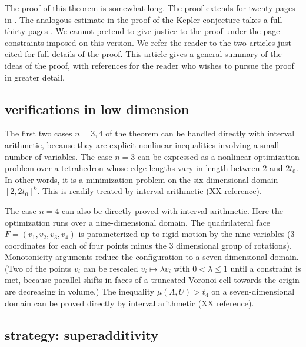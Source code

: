 The proof of this theorem is somewhat long.  The proof extends for 
twenty pages in  \cite[pp.19-38]{arx}.  The analogous estimate in
the proof of the Kepler conjecture takes a full thirty pages 
\cite[pp.126-156]{DCG}.
We cannot pretend to give justice to the proof under the page constraints
imposed on this version.  We refer the reader to the
two articles just cited for full details of the proof.  This article
 gives a general summary of the ideas of the proof, with 
references for the reader who wishes to pursue the proof in greater detail.

\subsection{verifications in low dimension}

The first two cases $n=3,4$ of the theorem can be handled directly with
interval arithmetic, because they are explicit nonlinear 
inequalities involving a small number of variables.  The case $n=3$ can
be expressed as a nonlinear optimization problem over a tetrahedron
whose edge lengths vary in length between $2$ and $2t_0$.  In other
words, it is a minimization problem on the six-dimensional 
domain $[2,2t_0]^6$. This is readily treated by interval arithmetic (XX reference).  

The case $n=4$ can also be directly proved with interval arithmetic.  
Here the optimization runs over a nine-dimensional domain.  The
quadrilateral face $F=(v_1,v_2,v_3,v_4)$ is parameterized up to rigid
motion by the nine variables (3 coordinates for each of four points
minus the 3 dimensional group of rotations).  Monotonicity arguments
reduce the configuration to a seven-dimensional domain.  (Two of the
points $v_i$ can be rescaled $v_i \mapsto \lambda v_i$ with $0 < \lambda \le 1$ until a constraint is met, 
because parallel shifts in faces of a truncated Voronoi cell towards the origin are decreasing in volume.)  The inequality $\mu(\Lambda,U)> t_4$ on
a seven-dimensional domain can be proved directly by interval arithmetic (XX reference).

\subsection{strategy: superadditivity}

